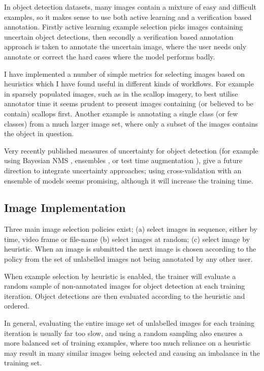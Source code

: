 In object detection datasets, many images contain a mixture of easy and difficult examples, so it makes sense to use both active learning and a verification based annotation.  Firstly active learning example selection picks images containing uncertain object detections, then secondly a verification based annotation approach is taken to annotate the uncertain image, where the user needs only annotate or correct the hard cases where the model performs badly.

I have implemented a number of simple metrics for selecting images based on heuristics which I have found useful in different kinds of workflows. For example in sparsely populated images, such as in the scallop imagery, to best utilise annotator time it seems prudent to present images containing (or believed to be contain) scallops first. Another example is annotating a single class (or few classes) from a much larger image set, where only a subset of the images contains the object in question.

Very recently published measures of uncertainty for object detection (for example using Bayesian \gls{NMS} \cite{Harakeh}, ensembles \cite{Le2018}, or test time augmentation \cite{Wei2018}), give a future direction to integrate uncertainty approaches; using cross-validation with an ensemble of models seems  promising, although it will increase the training time.

\subsection {Image Implementation}
\label{sec:example_implementation}

Three main image selection policies exist; (a) select images in sequence, either by time, video frame or file-name (b) select images at random; (c) select image by heuristic. When an image is submitted the next image is chosen according to the policy from the set of unlabelled images not being annotated by any other user.

When example selection by heuristic is enabled, the trainer will evaluate a random sample of non-annotated images for object detection at each training iteration. Object detections are then evaluated according to the heuristic and ordered. 

In general, evaluating the entire image set of unlabelled images for each training iteration is usually far too slow, and using a random sampling also ensures a more balanced set of training examples, where too much reliance  on a heuristic may result in many similar images being selected and causing an imbalance in the training set.

